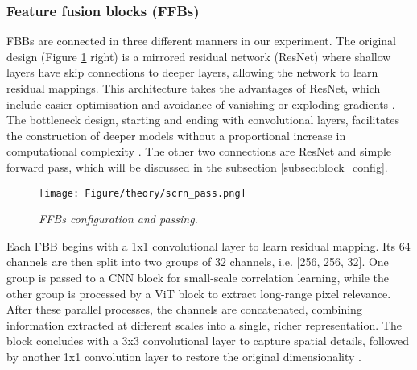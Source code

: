 \subsubsection{Feature fusion blocks (FFBs)}
FBBs are connected in three different manners in our experiment. The original design (Figure \ref{fig:scrn_pass} right) is a mirrored residual network (ResNet) where shallow layers have skip connections to deeper layers, allowing the network to learn residual mappings. This architecture takes the advantages of ResNet, which include easier optimisation and avoidance of vanishing or exploding gradients \cite{he2016deep}. The bottleneck design, starting and ending with convolutional layers, facilitates the construction of deeper models without a proportional increase in computational complexity \cite{srinivas2021bottleneck}. The other two connections are ResNet and simple forward pass, which will be discussed in the subsection \ref{subsec:block_config}.
\\
\begin{figure}[h]
	\centering
	\texttt{[image: Figure/theory/scrn\_pass.png]}
	\caption{\textit{FFBs configuration and passing.}}
	\label{fig:scrn_pass}
\end{figure}

\noindent Each FBB begins with a 1x1 convolutional layer to learn residual mapping. Its 64 channels are then split into two groups of 32 channels, i.e. [256, 256, 32]. One group is passed to a CNN block for small-scale correlation learning, while the other group is processed by a ViT block to extract long-range pixel relevance. After these parallel processes, the channels are concatenated, combining information extracted at different scales into a single, richer representation. The block concludes with a 3x3 convolutional layer to capture spatial details, followed by another 1x1 convolution layer to restore the original dimensionality \cite{gao2024swin}.

